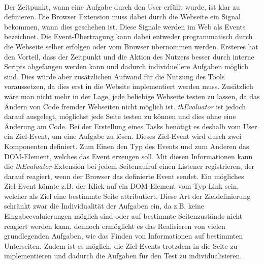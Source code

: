 \\
\label{events}
Der Zeitpunkt, wann eine Aufgabe durch den User erfüllt wurde, ist klar zu definieren. Die Browser Extension muss dabei durch die Webseite ein Signal bekommen, wann dies geschehen ist. Diese Signale werden im Web als Events bezeichnet. Die Event-Übertragung kann dabei entweder programmatisch durch die Webseite selber erfolgen oder vom Browser übernommen werden. Ersteres hat den Vorteil, dass der Zeitpunkt und die Aktion des Nutzers besser durch interne Scripts abgefangen werden kann und dadurch individuellere Aufgaben möglich sind. Dies würde aber zusätzlichen Aufwand für die Nutzung des Tools voraussetzen, da dies erst in die Website implementiert werden muss. Zusätzlich wäre man nicht mehr in der Lage, jede beliebige Webseite testen zu lassen, da das Ändern von Code fremder Webseiten nicht möglich ist. \textit{thEvaluator} ist jedoch darauf ausgelegt, möglichst jede Seite testen zu können und dies ohne eine Änderung am Code. Bei der Erstellung eines Tasks benötigt es deshalb vom User ein Ziel-Event, um eine Aufgabe zu lösen. Dieses Ziel-Event wird durch zwei Komponenten definiert. Zum Einen den Typ des Events und zum Anderen das \Gls{DOM}-Element, welches das Event erzeugen soll. Mit diesen Informationen kann die \textit{thEvaluator}-Extension bei jedem Seitenaufruf einen Listener registrieren, der darauf reagiert, wenn der Browser das definierte Event sendet. Ein mögliches Ziel-Event könnte z.B. der Klick auf ein \Gls{DOM}-Element vom Typ Link sein, welcher als Ziel eine bestimmte Seite attributiert. Diese Art der Zieldefinierung schränkt zwar die Individualität der Aufgaben ein, da z.B. keine Eingabeevaluierungen möglich sind oder auf bestimmte Seitenzustände nicht reagiert werden kann, dennoch ermöglicht es das Realisieren von vielen grundlegenden Aufgaben, wie das Finden von Informationen auf bestimmten Unterseiten. Zudem ist es möglich, die Ziel-Events trotzdem in die Seite zu implementieren und dadurch die Aufgaben für den Test zu individualisieren.